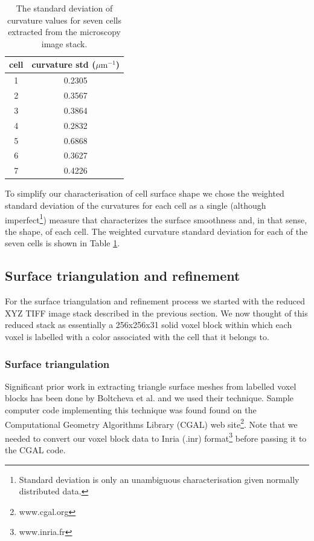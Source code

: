 \documentclass[a4paper,10pt]{article}
\begin{document}
\begin{table}[H]
\begin{center}
\footnotesize
\begin{tabular}{|c|c|}
\hline
cell &curvature std ($\mu \text{m}^{-1}$) \\
\hline
1 &0.2305\\
2 &0.3567\\
3 & 0.3864\\
4 &0.2832\\
5 &0.6868\\
6 &0.3627\\
7 & 0.4226\\
\hline
\end{tabular}
\end{center}
\caption{The standard deviation of curvature values for seven cells extracted from the microscopy image stack.}
\label{tab:ref_curv}
\end{table}

To simplify our characterisation of cell surface shape we chose the weighted standard deviation of the curvatures for each cell as a single (although imperfect\footnote{Standard deviation is only an unambiguous characterisation given normally distributed data.}) measure that characterizes the surface smoothness and, in that sense, the shape, of each cell. The weighted curvature standard deviation for each of the seven cells is shown in Table \ref{tab:ref_curv}.\\ 

\subsection{Surface triangulation and refinement}

For the surface triangulation and refinement process we started with the reduced XYZ TIFF image stack described in the previous section. We now thought of this reduced stack as essentially a 256x256x31 solid voxel block within which each voxel is labelled with a color associated with the cell that it belongs to. 

\subsubsection{Surface triangulation}

Significant prior work in extracting triangle surface meshes from labelled voxel blocks has been done by Boltcheva et al.\cite{boltcheva:inria-00420228} and we used their technique. Sample computer code implementing this technique was found found on the Computational Geometry Algorithms Library (CGAL) web site\footnote{www.cgal.org}. Note that we needed to convert our voxel block data to Inria (.inr) format\footnote{www.inria.fr} before passing it to the CGAL code.
\end{document}
